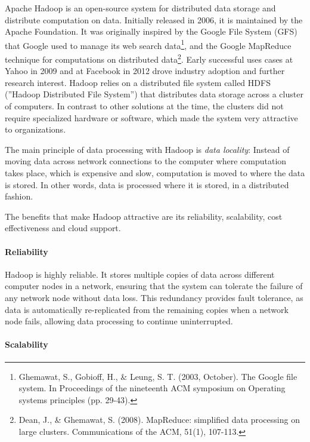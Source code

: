 Apache Hadoop is an open-source system for distributed data storage and distribute computation on data. Initially released in 2006, it is maintained by the Apache Foundation. It was originally inspired by the Google File System (GFS) that Google used to manage its web search data\footnote{Ghemawat, S., Gobioff, H., \& Leung, S. T. (2003, October). The Google file system. In Proceedings of the nineteenth ACM symposium on Operating systems principles (pp. 29-43).}, and the Google MapReduce technique for computations on distributed data\footnote{Dean, J., \& Ghemawat, S. (2008). MapReduce: simplified data processing on large clusters. Communications of the ACM, 51(1), 107-113.}. Early successful uses cases at Yahoo in 2009 and at Facebook in 2012 drove industry adoption and further research interest. Hadoop relies on a distributed file system called HDFS (''Hadoop Distributed File System'') that distributes data storage across a cluster of computers. In contrast to other solutions at the time, the clusters did not require specialized hardware or software, which made the system very attractive to organizations. 

The main principle of data processing with Hadoop is \emph{data locality}: Instead of moving data across network connections to the computer where computation takes place, which is expensive and slow, computation is moved to where the data is stored. In other words, data is processed where it is stored, in a distributed fashion.

The benefits that make Hadoop attractive are its reliability, scalability, cost effectiveness and cloud support. 

\paragraph*{Reliability}

Hadoop is highly reliable. It stores multiple copies of data across different computer nodes in a network, ensuring that the system can tolerate the failure of any network node without data loss. This redundancy provides fault tolerance, as data is automatically re-replicated from the remaining copies when a network node fails, allowing data processing to continue uninterrupted.

\paragraph*{Scalability}

